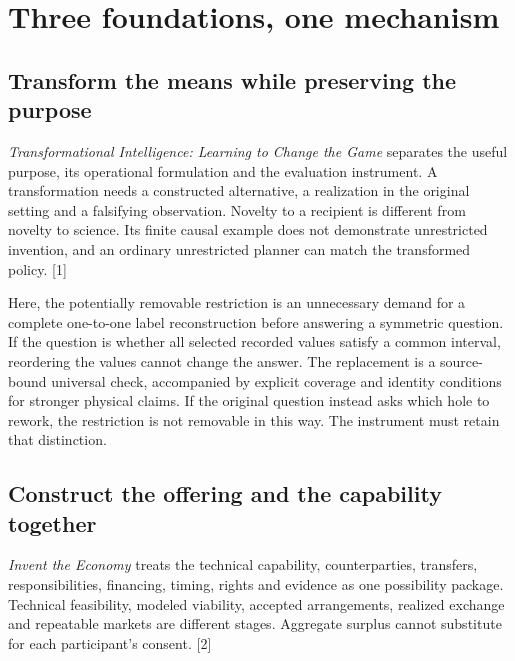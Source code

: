 \documentclass[
  11pt,
]{article}
\let\OriginalSection\section
\renewcommand{\section}{\needspace{5\baselineskip}\OriginalSection}
\let\OriginalSubsection\subsection
\renewcommand{\subsection}{\needspace{6\baselineskip}\OriginalSubsection}
\begin{document}
\hypertarget{three-foundations-one-mechanism}{%
\section{Three foundations, one
mechanism}\label{three-foundations-one-mechanism}}

\hypertarget{transform-the-means-while-preserving-the-purpose}{%
\subsection{Transform the means while preserving the
purpose}\label{transform-the-means-while-preserving-the-purpose}}

\emph{Transformational Intelligence: Learning to Change the Game}
separates the useful purpose, its operational formulation and the
evaluation instrument. A transformation needs a constructed alternative,
a realization in the original setting and a falsifying observation.
Novelty to a recipient is different from novelty to science. Its finite
causal example does not demonstrate unrestricted invention, and an
ordinary unrestricted planner can match the transformed policy. {[}1{]}

Here, the potentially removable restriction is an unnecessary demand for
a complete one-to-one label reconstruction before answering a symmetric
question. If the question is whether all selected recorded values
satisfy a common interval, reordering the values cannot change the
answer. The replacement is a source-bound universal check, accompanied
by explicit coverage and identity conditions for stronger physical
claims. If the original question instead asks which hole to rework, the
restriction is not removable in this way. The instrument must retain
that distinction.

\hypertarget{construct-the-offering-and-the-capability-together}{%
\subsection{Construct the offering and the capability
together}\label{construct-the-offering-and-the-capability-together}}

\emph{Invent the Economy} treats the technical capability,
counterparties, transfers, responsibilities, financing, timing, rights
and evidence as one possibility package. Technical feasibility, modeled
viability, accepted arrangements, realized exchange and repeatable
markets are different stages. Aggregate surplus cannot substitute for
each participant's consent. {[}2{]}
\end{document}
